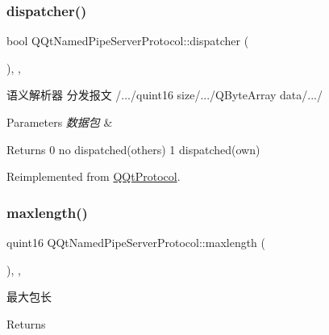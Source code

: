 \subsubsection{\texorpdfstring{dispatcher()}{dispatcher()}}
{\footnotesize\ttfamily bool Q\+Qt\+Named\+Pipe\+Server\+Protocol\+::dispatcher (\begin{DoxyParamCaption}\item[{const Q\+Byte\+Array \&}]{ }\end{DoxyParamCaption})\hspace{0.3cm}{\ttfamily [override]}, {\ttfamily [protected]}, {\ttfamily [virtual]}}



语义解析器 分发报文 /.../quint16 size/.../\+Q\+Byte\+Array data/.../ 


\begin{DoxyParams}{Parameters}
{\em 数据包} & \\
\hline
\end{DoxyParams}
\begin{DoxyReturn}{Returns}
0 no dispatched(others) 1 dispatched(own) 
\end{DoxyReturn}


Reimplemented from \mbox{\hyperlink{class_q_qt_protocol_a35a69c4b89c8cf7459038f40d75e0dc9}{Q\+Qt\+Protocol}}.

\mbox{\label{class_q_qt_named_pipe_server_protocol_a1ed70a94ce8e3a85af4ffe874b731eec}} 
\subsubsection{\texorpdfstring{maxlength()}{maxlength()}}
{\footnotesize\ttfamily quint16 Q\+Qt\+Named\+Pipe\+Server\+Protocol\+::maxlength (\begin{DoxyParamCaption}{ }\end{DoxyParamCaption})\hspace{0.3cm}{\ttfamily [override]}, {\ttfamily [protected]}, {\ttfamily [virtual]}}



最大包长 

\begin{DoxyReturn}{Returns}

\end{DoxyReturn}


